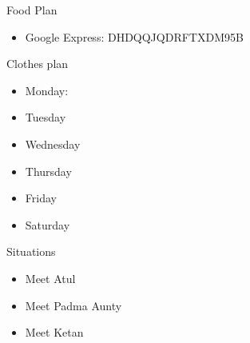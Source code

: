 \begin{columns}
    \begin{column}{0.20\linewidth}
      \begin{block}{Food Plan} 
        \begin{itemize}
          \tiny \item \tiny Google Express: DHDQQJQDRFTXDM95B
        \end{itemize}
      \end{block} 
      \begin{block}{Clothes plan} 
        \begin{itemize}
          \tiny \item \tiny Monday: 
        \item \tiny Tuesday
        \item \tiny Wednesday
        \item \tiny Thursday
        \item \tiny Friday
        \item \tiny Saturday
        \end{itemize} 
      \end{block} 
      
      \begin{block}{Situations}
        \begin{itemize}
        \item \tiny Meet Atul 
        \item \tiny Meet Padma Aunty
          \item \tiny Meet Ketan 
        \end{itemize}
      \end{block}
    \end{column}
\end{columns}
